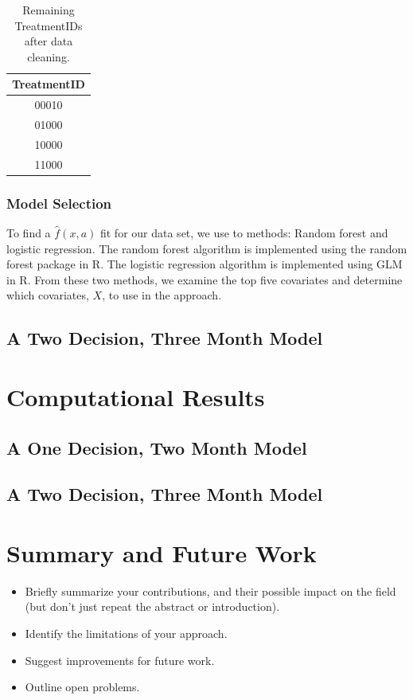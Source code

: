\documentclass[10pt]{article}
\begin{document}
\begin{table}[H]
	\centering
	\begin{tabular}{c}
		\textbf{TreatmentID} \\
		\hline
		00010 \\
		01000 \\
		10000 \\
		11000 \\
	\end{tabular}
	\caption{Remaining TreatmentIDs after data cleaning.}
	\label{ids1}
\end{table}

\subsubsection{Model Selection}

To find a $\hat{f}(x,a)$ fit for our data set, we use to methods: Random forest and logistic regression. The random forest algorithm is implemented using the random forest package in R. The logistic regression algorithm is implemented using GLM in R. From these two methods, we examine the top five covariates and determine which covariates, $X$, to use in the approach.

\subsection{A Two Decision, Three Month Model}




\section{Computational Results}

\subsection{A One Decision, Two Month Model}

\subsection{A Two Decision, Three Month Model}


\section{Summary and Future Work}
\begin{itemize}
\item Briefly summarize your contributions, and their possible
impact on the field (but don't just repeat the abstract or introduction).
\item Identify the limitations of your approach.
\item Suggest improvements for future work.
\item Outline open problems.
\end{itemize}
\end{document}
